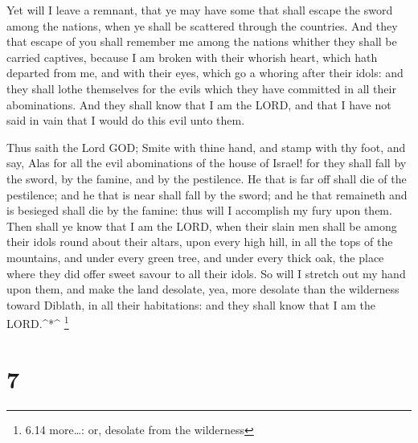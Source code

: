  Yet will I leave a remnant, that ye may have some that
shall escape the sword among the nations, when ye shall be scattered
through the countries.  And they that escape of you shall
remember me among the nations whither they shall be carried captives,
because I am broken with their whorish heart, which hath departed from
me, and with their eyes, which go a whoring after their idols: and they
shall lothe themselves for the evils which they have committed in all
their abominations.  And they shall know that I am the
LORD, and that I have not said in vain that I would do this evil unto
them.

 Thus saith the Lord GOD; Smite with thine hand, and stamp
with thy foot, and say, Alas for all the evil abominations of the house
of Israel! for they shall fall by the sword, by the famine, and by the
pestilence.  He that is far off shall die of the
pestilence; and he that is near shall fall by the sword; and he that
remaineth and is besieged shall die by the famine: thus will I
accomplish my fury upon them.  Then shall ye know that I am
the LORD, when their slain men shall be among their idols round about
their altars, upon every high hill, in all the tops of the mountains,
and under every green tree, and under every thick oak, the place where
they did offer sweet savour to all their idols.  So will I
stretch out my hand upon them, and make the land desolate, yea, more
desolate than the wilderness toward Diblath, in all their habitations:
and they shall know that I am the LORD.\^{}*\^{} \footnote{6.14
  more\ldots: or, desolate from the wilderness}

\hypertarget{section-6}{%
\section{7}\label{section-6}}

